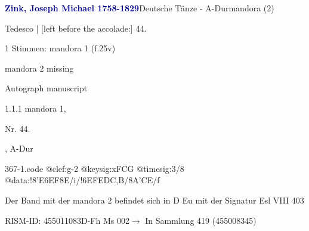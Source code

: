 \documentclass[twocolumn, 12pt]{book}
\begin{document}
\par \vspace{16pt} \textcolor{darkblue}{\textbf{Zink, Joseph Michael  1758-1829}}\hfillplus{\textbf{[367]}}\newline Deutsche Tänze - A-Dur\newline mandora (2)
\par \begin{itshape}[f.25v, at left:] Tedesco | [left before the accolade:] 44.\end{itshape} 
\par \textcolor{darkblue}{}  1 Stimmen: mandora 1  (f.25v)\newline \begin{small} mandora 2 missing\end{small} \newline Autograph manuscript
\par 1.1.1  mandora 1, \begin{itshape}Nr. 44.\end{itshape}, A-Dur  
\begin{filecontents*}{367-1.code}
@clef:g-2
@keysig:xFCG
@timesig:3/8
@data:!{8'E6EF}8E/i/!{6EF}{ED}{C,B}/8A'CE/f
\end{filecontents*}
\newline %
\par Der Band mit der mandora 2 befindet sich in D Eu mit der Signatur Esl VIII 403
\par RISM-ID: 455011083\newline D-Fh  Ms 002\newline $\rightarrow$ In Sammlung 419 (455008345)
      
\end{document}
